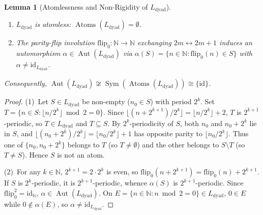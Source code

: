 \documentclass[11pt]{article}
\newtheorem{lemma}[theorem]{Lemma}
\theoremstyle{definition}
\theoremstyle{remark}
\newcommand{\Aut}{\operatorname{Aut}}
\newcommand{\Sym}{\operatorname{Sym}}
\newcommand{\Atoms}{\operatorname{Atoms}}
\newcommand{\id}{\mathrm{id}}
\newcommand{\N}{\mathbb{N}}
\newcommand{\Ldyad}{L_{\mathrm{dyad}}}
\begin{document}
\begin{lemma}[Atomlessness and Non-Rigidity of $\Ldyad$]
\label{lem:dyadic}
\begin{enumerate}
  \item $\Ldyad$ is atomless: $\Atoms(\Ldyad) = \emptyset$.
  \item The parity-flip involution $\mathrm{flip}_0 : \N \to \N$ exchanging $2m \leftrightarrow 2m+1$ induces an automorphism $\alpha \in \Aut(\Ldyad)$ via $\alpha(S) = \{n \in \N : \mathrm{flip}_0(n) \in S\}$ with $\alpha \neq \id_{\Ldyad}$.
\end{enumerate}
Consequently, $\Aut(\Ldyad) \not\cong \Sym(\Atoms(\Ldyad)) \cong \{\id\}$.
\end{lemma}
\begin{proof}
(1)~Let $S \in \Ldyad$ be non-empty ($n_0 \in S$) with period $2^k$. Set $T = \{n \in S : \lfloor n / 2^k \rfloor \bmod 2 = 0\}$. Since $\lfloor (n + 2^{k+1}) / 2^k \rfloor = \lfloor n / 2^k \rfloor + 2$, $T$ is $2^{k+1}$-periodic, so $T \in \Ldyad$ and $T \subseteq S$. By $2^k$-periodicity of $S$, both $n_0$ and $n_0 + 2^k$ lie in $S$, and $\lfloor (n_0 + 2^k)/2^k \rfloor = \lfloor n_0 / 2^k \rfloor + 1$ has opposite parity to $\lfloor n_0 / 2^k \rfloor$. Thus one of $\{n_0, n_0 + 2^k\}$ belongs to $T$ (so $T \neq \emptyset$) and the other belongs to $S \setminus T$ (so $T \neq S$). Hence $S$ is not an atom.

(2)~For any $k \in \N$, $2^{k+1} = 2 \cdot 2^k$ is even, so $\mathrm{flip}_0(n + 2^{k+1}) = \mathrm{flip}_0(n) + 2^{k+1}$. If $S$ is $2^k$-periodic, it is $2^{k+1}$-periodic, whence $\alpha(S)$ is $2^{k+1}$-periodic. Since $\mathrm{flip}_0^2 = \id_\N$, $\alpha \in \Aut(\Ldyad)$. On $E = \{n \in \N : n \bmod 2 = 0\} \in \Ldyad$, $0 \in E$ while $0 \notin \alpha(E)$, so $\alpha \neq \id_{\Ldyad}$.
\end{proof}
\end{document}

